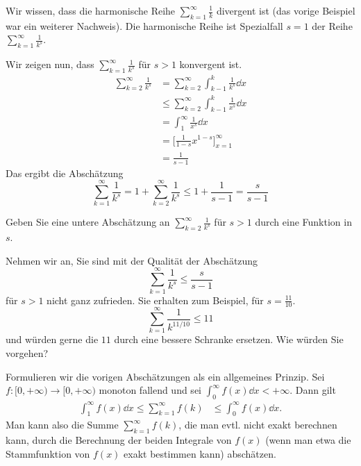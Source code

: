 \begin{bsp}
	Wir wissen, dass die harmonische Reihe $\sum_{k=1}^\infty \frac{1}{k}$ divergent ist (das vorige Beispiel war ein weiterer Nachweis). Die harmonische Reihe ist Spezialfall $s=1$ der Reihe $\sum_{k=1}^\infty \frac{1}{k^s}$.

	Wir zeigen nun, dass $\sum_{k=1}^\infty \frac{1}{k^s}$ für $s>1$ konvergent ist. 
	\begin{align*}
		\sum_{k=2}^\infty \frac{1}{k^s} & = \sum_{k=2}^\infty \int_{k-1}^k \frac{1}{k^s} \dd x
			\\ & \le \sum_{k=2}^\infty \int_{k-1}^k \frac{1}{x^s} \dd x
			\\ & = \int_1^\infty \frac{1}{x^s} \dd x
			\\ & = \biggl[ \frac{1}{1-s} x^{1-s} \biggr]_{x=1}^\infty 
			\\ & = \frac{1}{s-1}
	\end{align*} 
	Das ergibt die Abschätzung
	\[
		\sum_{k=1}^\infty \frac{1}{k^s} = 1 + \sum_{k=2}^\infty \frac{1}{k^s} \le 1 + \frac{1}{s-1} = \frac{s}{s-1}
	\]
\end{bsp} 

\begin{aufg}
	Geben Sie eine untere Abschätzung an $\sum_{k=2}^\infty \frac{1}{k^s}$ für $s > 1$ durch eine Funktion in $s$. 
\end{aufg} 

\begin{aufg} 
	Nehmen wir an, Sie sind mit der Qualität der Abschätzung 
	\[
		\sum_{k=1}^\infty \frac{1}{k^s} \le \frac{s}{s-1}
	\]
	für $s > 1$ nicht ganz zufrieden. Sie erhalten zum Beispiel, für $s=\frac{11}{10}$. 
	\[
		\sum_{k=1}^\infty \frac{1}{k^{11/10}} \le 11
	\]
	und würden gerne die $11$ durch eine bessere Schranke ersetzen. Wie würden Sie vorgehen? 
\end{aufg} 

\begin{bem}
	Formulieren wir die vorigen Abschätzungen als ein allgemeines Prinzip. Sei $f : [0,+\infty) \to [0,+\infty)$ monoton fallend und sei $\int_0^\infty f(x) \dd x < +\infty$. Dann gilt
	\begin{align*}
		\int_1^\infty f(x) \dd x \le \sum_{k=1}^\infty f(k) & \le \int_0^\infty f(x) \dd x.
	\end{align*}
	Man kann also die Summe $\sum_{k=1}^\infty f(k)$, die man evtl. nicht exakt berechnen kann, durch die Berechnung der beiden Integrale von $f(x)$ (wenn man etwa die Stammfunktion von $f(x)$ exakt bestimmen kann) abschätzen. 
\end{bem} 

